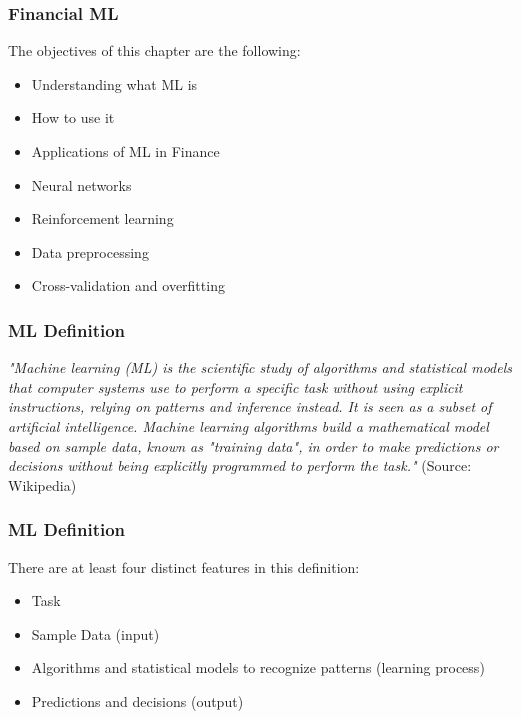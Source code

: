 \documentclass[xcolor=dvipsnames, english, 8pt]{beamer}
\begin{document}
\begin{frame}
    \frametitle{Financial ML}
    The objectives of this chapter are the following:\vspace{0.25cm}\\
    \begin{itemize}
        \item Understanding what ML is
        \item How to use it
        \item Applications of ML in Finance
        \item Neural networks
        \item Reinforcement learning
        \item Data preprocessing
        \item Cross-validation and overfitting
    \end{itemize}
\end{frame}



\begin{frame}
    \frametitle{ML Definition}
\emph{"Machine learning (ML) is the scientific study of {\color{ubRed}algorithms and statistical models} that  {\color{ubRed}computer systems} use to  {\color{ubRed}perform a specific task without using explicit instructions}, relying on  {\color{ubRed}patterns} and inference instead. It is seen as a subset of artificial intelligence. Machine learning algorithms  {\color{ubRed}build a mathematical model based on sample data}, known as "training data", in order to  {\color{ubRed}make predictions or decisions} without being explicitly programmed to perform the task."} \tiny{(Source: Wikipedia)}
\end{frame}

\begin{frame}
    \frametitle{ML Definition}
There are at least four distinct features in this definition:\vspace{0.25cm}\\
\begin{itemize}
    \item Task
    \item Sample Data ({\color{ubRed}input})
    \item Algorithms and statistical models to recognize patterns ({\color{ubRed}learning process})
    \item Predictions and decisions ({\color{ubRed}output})
\end{itemize}
\end{frame}
\end{document}

